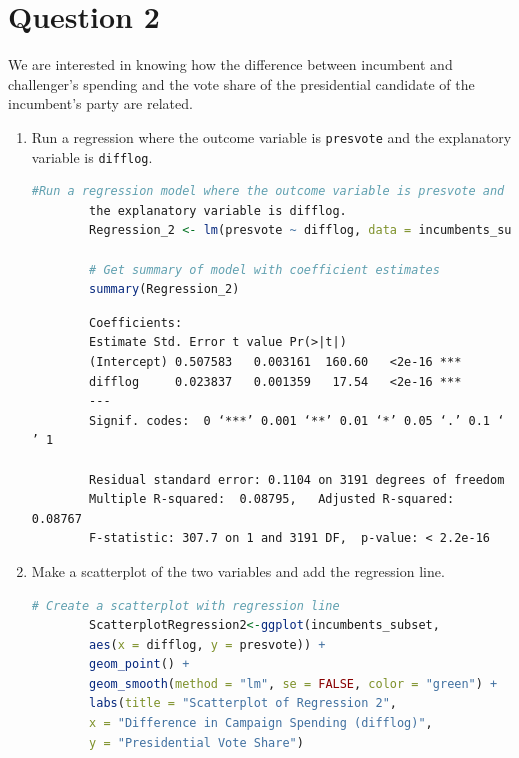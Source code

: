 \documentclass[12pt,letterpaper]{article}
\begin{document}
\section*{Question 2}
\noindent We are interested in knowing how the difference between incumbent and challenger's spending and the vote share of the presidential candidate of the incumbent's party are related.	\vspace{.25cm}
	\begin{enumerate}
		\item Run a regression where the outcome variable is \texttt{presvote} and the explanatory variable is \texttt{difflog}.	\vspace{1cm}
		
		\begin{lstlisting}[language=R, caption={Regression Model 2 in R}, label={lst:regression_model}]
		#Run a regression model where the outcome variable is presvote and 
		the explanatory variable is difflog.
		Regression_2 <- lm(presvote ~ difflog, data = incumbents_subset)
	
		# Get summary of model with coefficient estimates
		summary(Regression_2)
		\end{lstlisting}		
		
		
		\begin{verbatim}
		Coefficients:
		Estimate Std. Error t value Pr(>|t|)    
		(Intercept) 0.507583   0.003161  160.60   <2e-16 ***
		difflog     0.023837   0.001359   17.54   <2e-16 ***
		---
		Signif. codes:  0 ‘***’ 0.001 ‘**’ 0.01 ‘*’ 0.05 ‘.’ 0.1 ‘ ’ 1
		
		Residual standard error: 0.1104 on 3191 degrees of freedom
		Multiple R-squared:  0.08795,	Adjusted R-squared:  0.08767 
		F-statistic: 307.7 on 1 and 3191 DF,  p-value: < 2.2e-16
	\end{verbatim}
		
		\newpage
		\item Make a scatterplot of the two variables and add the regression line. 	\vspace{1cm}
		
		\begin{lstlisting}[language=R, caption={Scatterplot 1 code in R}, label={lst:regression_model}]
		# Create a scatterplot with regression line
		ScatterplotRegression2<-ggplot(incumbents_subset, 
		aes(x = difflog, y = presvote)) +
		geom_point() +
		geom_smooth(method = "lm", se = FALSE, color = "green") +
		labs(title = "Scatterplot of Regression 2",
		x = "Difference in Campaign Spending (difflog)",
		y = "Presidential Vote Share")
		

\end{lstlisting}
\end{enumerate}
\end{document}
